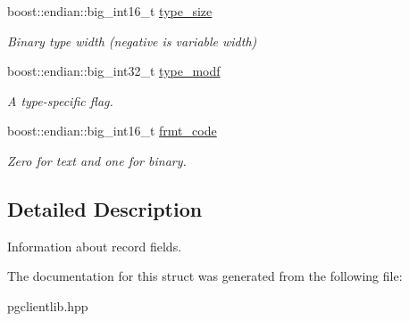 \begin{DoxyCompactItemize}
\mbox{\label{structsession_1_1field__descriptor_a1933d0ab3a8f78498ec9df068cf2fbb3}} 
boost\+::endian\+::big\+\_\+int16\+\_\+t \hyperlink{structsession_1_1field__descriptor_a1933d0ab3a8f78498ec9df068cf2fbb3}{type\+\_\+size}
\begin{DoxyCompactList}\small\item\em Binary type width (negative is variable width) \end{DoxyCompactList}\item 
\mbox{\label{structsession_1_1field__descriptor_adecb129c3193ac7e467a52b2ebc40e44}} 
boost\+::endian\+::big\+\_\+int32\+\_\+t \hyperlink{structsession_1_1field__descriptor_adecb129c3193ac7e467a52b2ebc40e44}{type\+\_\+modf}
\begin{DoxyCompactList}\small\item\em A type-\/specific flag. \end{DoxyCompactList}\item 
\mbox{\label{structsession_1_1field__descriptor_ae29dd52d710b630f2ff06c51fc3c5a30}} 
boost\+::endian\+::big\+\_\+int16\+\_\+t \hyperlink{structsession_1_1field__descriptor_ae29dd52d710b630f2ff06c51fc3c5a30}{frmt\+\_\+code}
\begin{DoxyCompactList}\small\item\em Zero for text and one for binary. \end{DoxyCompactList}\end{DoxyCompactItemize}


\subsection{Detailed Description}
Information about record fields. 

The documentation for this struct was generated from the following file\+:\begin{DoxyCompactItemize}
\item 
pgclientlib.\+hpp\end{DoxyCompactItemize}
